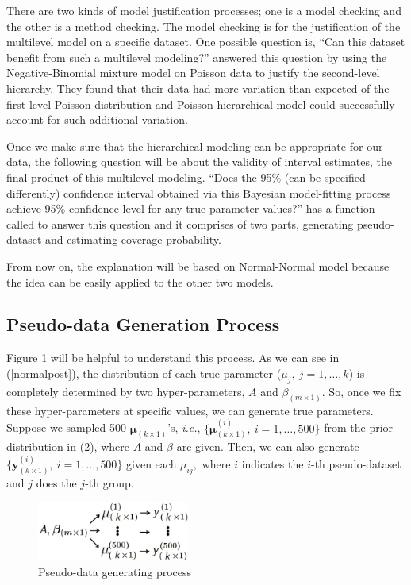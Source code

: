 \documentclass[article]{jss}
\begin{document}
There are two kinds of model justification processes; one is a model checking and the other is a method checking. The model checking is for the justification of the multilevel model on a specific dataset. One possible question is, ``Can this dataset benefit from such a multilevel modeling?'' \cite{1997} answered this question by using the Negative-Binomial mixture model on Poisson data to justify the second-level hierarchy. They found that their data had more variation than expected of the first-level Poisson distribution and Poisson hierarchical model could successfully account for such additional variation.


Once we make sure that the hierarchical modeling can be appropriate for our data, the following question will be about the validity of interval estimates, the final product of this multilevel modeling. ``Does the 95\% (can be specified differently) confidence interval obtained via this Bayesian model-fitting process achieve 95\% confidence level  for any true parameter values?''  has a function called  to answer this question and it comprises of two parts, generating pseudo-dataset and estimating coverage probability.

From now on, the explanation will be based on Normal-Normal model because the idea can be easily applied to the other two models.

\subsection{Pseudo-data Generation Process}
Figure 1 will be helpful to understand this process. As we can see in (\ref{normalpost}), the distribution of each true parameter ($\mu_{j},~j=1,\ldots, k$) is completely determined by two hyper-parameters, $A$ and $\beta_{(m\times1)}$. So, once we fix these hyper-parameters at specific values, we can generate true parameters. Suppose we sampled 500 $\mathbf{\mu}_{(k\times1)}$'s, \emph{i.e.}, $\{\mathbf{\mu}^{(i)}_{(k\times1)},~i=1, \ldots, 500\}$ from the prior distribution in (2), where $A$ and $\beta$ are given. Then, we can also generate $\{\mathbf{y}^{(i)}_{(k\times1)},~i=1, \ldots, 500\}$ given each $\mu_{ij},$ where $i$ indicates the $i$-th pseudo-dataset and $j$ does the $j$-th group. 

\begin{figure}[h]
\begin{center}
\includegraphics[width=5cm]{process.png}
\caption{Pseudo-data generating process}
\end{center}
\end{figure}
\end{document}
